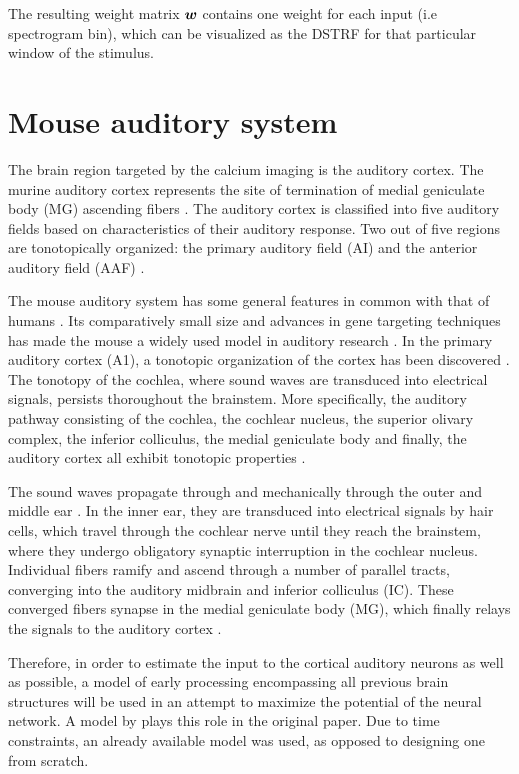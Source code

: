 The resulting weight matrix $\bm{w}$ contains one weight for each input (i.e spectrogram bin), which can be visualized as the DSTRF for that particular window of the stimulus.

\section{Mouse auditory system}
The brain region targeted by the calcium imaging is the auditory cortex. The murine auditory cortex represents the site of termination of medial geniculate body (MG) ascending fibers \parencite{malmiercaAuditorySystem2012}. The auditory cortex is classified into five auditory fields based on characteristics of their auditory response. Two out of five regions are tonotopically organized: the primary auditory field (AI) and the anterior auditory field (AAF) \parencite{malmiercaAuditorySystem2012}.

The mouse auditory system has some general features in common with that of humans \parencite{malmiercaAuditorySystem2012}. Its comparatively small size and advances in gene targeting techniques has made the mouse a widely used model in auditory research \parencite{malmiercaAuditorySystem2012}. In the primary auditory cortex (A1), a tonotopic organization of the cortex has been discovered  \parencite{malmiercaAuditorySystem2012}. The tonotopy of the cochlea, where sound waves are transduced into electrical signals, persists thoroughout the brainstem. More specifically, the auditory pathway consisting of the cochlea, the cochlear nucleus, the superior olivary complex, the inferior colliculus, the medial geniculate body and finally, the auditory cortex all exhibit tonotopic properties  \parencite{malmiercaAuditorySystem2012}.

The sound waves propagate through and mechanically through the outer and middle ear \parencite{malmiercaAuditorySystem2012}. In the inner ear, they are transduced into electrical signals by hair cells, which travel through the cochlear nerve until they reach the brainstem, where they undergo obligatory synaptic interruption in the cochlear nucleus. Individual fibers ramify and ascend through a number of parallel tracts, converging into the auditory midbrain and inferior colliculus (IC). These converged fibers synapse in the medial geniculate body (MG), which finally relays the signals to the auditory cortex \parencite{malmiercaAuditorySystem2012}.

Therefore, in order to estimate the input to the cortical auditory neurons as well as possible, a model of early processing encompassing all previous brain structures will be used in an attempt to maximize the potential of the neural network. A model by \textcite{yangAuditoryRepresentationsAcoustic1992} plays this role in the original paper. Due to time constraints, an already available model was used, as opposed to designing one from scratch.

